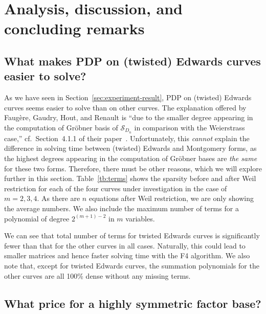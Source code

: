 
\section{Analysis, discussion, and concluding remarks}
\label{sec:analysis}

\subsection{What makes PDP on (twisted) Edwards curves easier to
  solve?}

As we have seen in Section~\ref{sec:experiment-result}, PDP on
(twisted) Edwards curves seems easier to solve than on other curves.
%
The explanation offered by Faug\`ere, Gaudry, Hout, and Renault is
``due to the smaller degree appearing in the computation of Gr\"obner
basis of $\mathscr S_{D_n}$ in comparison with the Weierstrass case,''
cf.~Section~4.1.1 of their
paper~\cite{DBLP:journals/joc/FaugereGHR14}.
%
Unfortunately, this \emph{cannot} explain the difference in solving
time between (twisted) Edwards and Montgomery forms, as the highest
degrees appearing in the computation of Gr\"obner bases are \emph{the
  same} for these two forms.
%
Therefore, there must be other reasons, which we will explore further
in this section.
%
Table~\ref{tb:terms} shows the sparsity before and after Weil
restriction for each of the four curves under investigation in the
case of $m=2,3,4$.
%
As there are $n$ equations after Weil restriction, we are only showing
the average numbers.
%
We also include the maximum number of terms for a polynomial of degree
$2^{(m+1)-2}$ in $m$ variables.
%


We can see that total number of terms for twisted Edwards curves is
significantly fewer than that for the other curves in all cases.
%
Naturally, this could lead to smaller matrices and hence faster
solving time with the F4 algorithm.
%
We also note that, except for twisted Edwards curves, the summation
polynomials for the other curves are all 100\% dense without any
missing terms.





\subsection{What price for a highly symmetric factor base?}

